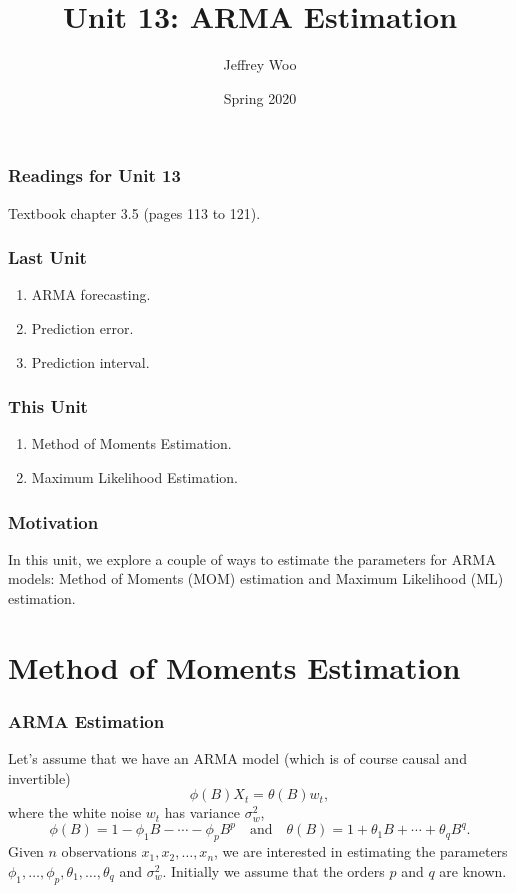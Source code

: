 \documentclass[%
xcolor=pdftex]{beamer}
\title{Unit 13: ARMA Estimation}
\author[STAT 5170: Applied Time Series, Unit 13]{Jeffrey Woo}
\institute{Department of Statistics, University of Virginia}
\date{Spring 2020}
\begin{document}
\frame{\titlepage}


\begin{frame}
\frametitle{Readings for Unit 13}

Textbook chapter 3.5 (pages 113 to 121).

\end{frame}



\begin{frame}
\frametitle{Last Unit}
\begin{enumerate}
\item ARMA forecasting.
\item Prediction error.
\item Prediction interval.
\end{enumerate}
\end{frame}

\begin{frame}
\frametitle{This Unit}
\begin{enumerate}
\item Method of Moments Estimation.
\item Maximum Likelihood Estimation.
\end{enumerate}
\end{frame}


\begin{frame}
\frametitle{Motivation}

In this unit, we explore a couple of ways to estimate the parameters for ARMA models: Method of Moments (MOM) estimation and Maximum Likelihood (ML) estimation.

\end{frame}

\section{Method of Moments Estimation}
\frame{\tableofcontents[currentsection]}

\begin{frame}
\frametitle{ARMA Estimation}

Let's assume that we have an ARMA model (which is of course causal and invertible)
$$
\phi(B)  X_t = \theta(B) w_t,
$$
where the white noise $w_t$ has variance $\sigma^2_w$,
$$
\phi(B) = 1-\phi_1 B - \cdots - \phi_p B^p \quad
\mbox{and} \quad
\theta(B) = 1+\theta_1 B + \cdots+\theta_q B^q.
$$
Given $n$ observations $x_1,x_2,\ldots,x_n$, we are interested
in estimating the parameters
$\phi_1,\ldots,\phi_p,\theta_1,\ldots,\theta_q$ and
$\sigma^2_w$. Initially we assume that the orders $p$ and $q$
are known.
\end{frame}
\end{document}
